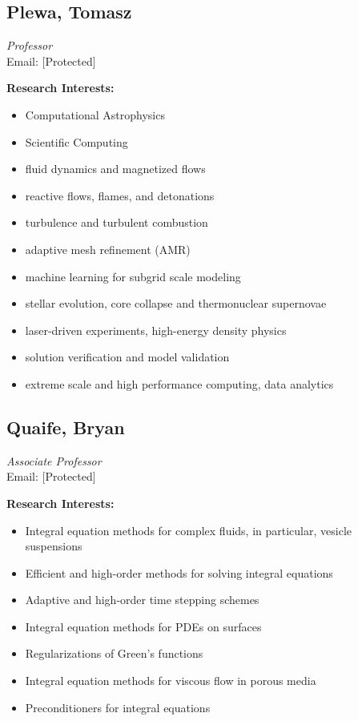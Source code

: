 \documentclass[12pt,a4paper]{article}
\begin{document}
\subsection{Plewa, Tomasz}
\textit{Professor} \\
Email: [Protected]

\textbf{Research Interests:}
\begin{itemize}
    \item Computational Astrophysics
    \item Scientific Computing
    \item fluid dynamics and magnetized flows
    \item reactive flows, flames, and detonations
    \item turbulence and turbulent combustion
    \item adaptive mesh refinement (AMR)
    \item machine learning for subgrid scale modeling
    \item stellar evolution, core collapse and thermonuclear supernovae
    \item laser-driven experiments, high-energy density physics
    \item solution verification and model validation
    \item extreme scale and high performance computing, data analytics
\end{itemize}

\subsection{Quaife, Bryan}
\textit{Associate Professor} \\
Email: [Protected]

\textbf{Research Interests:}
\begin{itemize}
    \item Integral equation methods for complex fluids, in particular, vesicle suspensions
    \item Efficient and high-order methods for solving integral equations
    \item Adaptive and high-order time stepping schemes
    \item Integral equation methods for PDEs on surfaces
    \item Regularizations of Green's functions
    \item Integral equation methods for viscous flow in porous media
    \item Preconditioners for integral equations
\end{itemize}
\end{document}
